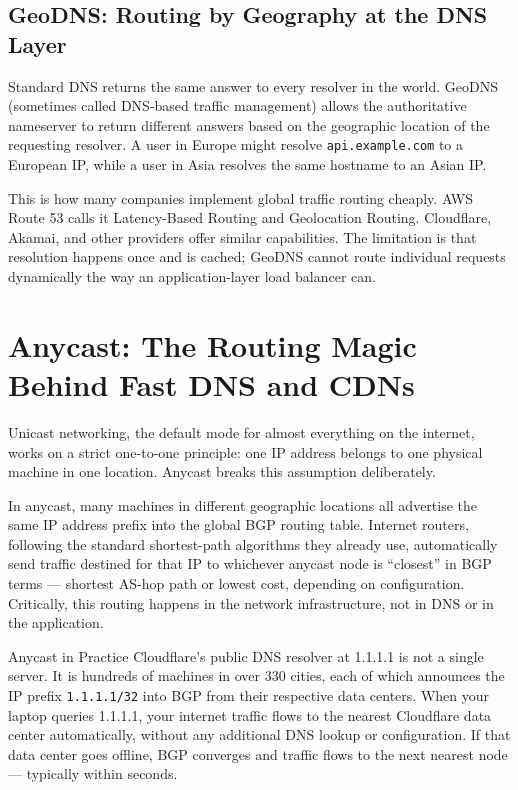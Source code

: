 \documentclass[11pt,a4paper]{article}
\begin{document}
\subsection{GeoDNS: Routing by Geography at the DNS Layer}

Standard DNS returns the same answer to every resolver in the world. GeoDNS (sometimes called DNS-based traffic management) allows the authoritative nameserver to return different answers based on the geographic location of the requesting resolver. A user in Europe might resolve \texttt{api.example.com} to a European IP, while a user in Asia resolves the same hostname to an Asian IP.

This is how many companies implement global traffic routing cheaply. AWS Route 53 calls it Latency-Based Routing and Geolocation Routing. Cloudflare, Akamai, and other providers offer similar capabilities. The limitation is that resolution happens once and is cached; GeoDNS cannot route individual requests dynamically the way an application-layer load balancer can.

\section{Anycast: The Routing Magic Behind Fast DNS and CDNs}

Unicast networking, the default mode for almost everything on the internet, works on a strict one-to-one principle: one IP address belongs to one physical machine in one location. Anycast breaks this assumption deliberately.

In anycast, many machines in different geographic locations all advertise the same IP address prefix into the global BGP routing table. Internet routers, following the standard shortest-path algorithms they already use, automatically send traffic destined for that IP to whichever anycast node is ``closest'' in BGP terms --- shortest AS-hop path or lowest cost, depending on configuration. Critically, this routing happens in the network infrastructure, not in DNS or in the application.

\begin{termbox}{Anycast in Practice}
Cloudflare's public DNS resolver at 1.1.1.1 is not a single server. It is hundreds of machines in over 330 cities, each of which announces the IP prefix \texttt{1.1.1.1/32} into BGP from their respective data centers. When your laptop queries 1.1.1.1, your internet traffic flows to the nearest Cloudflare data center automatically, without any additional DNS lookup or configuration. If that data center goes offline, BGP converges and traffic flows to the next nearest node --- typically within seconds.
\end{termbox}
\end{document}
